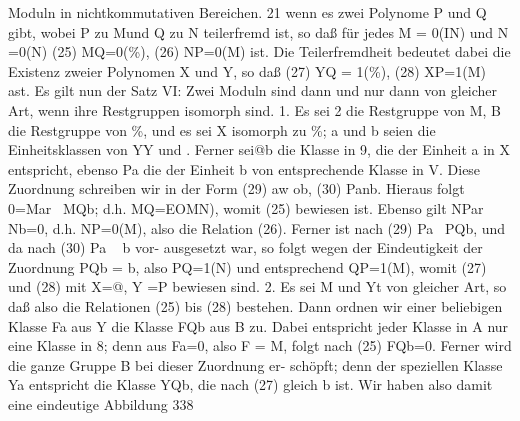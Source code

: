 \documentclass[11pt,a4paper]{article}
\theoremstyle{plain}
\theoremstyle{definition}
\begin{document}
Moduln in nichtkommutativen Bereichen. 
21 
wenn 
es zwei Polynome P und Q gibt, wobei P zu Mund Q zu N 
teilerfremd ist, so daß für jedes 
M = 0(IN) und N =0(N) 
(25) 
MQ=0(\%), 
(26) 
NP=0(M) 
ist. 
Die Teilerfremdheit bedeutet dabei die Existenz zweier Polynomen 
X und Y, so daß 
(27) 
YQ = 1(\%), 
(28) 
XP=1(M) 
ast. 
Es gilt nun der 
Satz VI: Zwei Moduln sind dann und nur dann von gleicher Art, 
wenn ihre Restgruppen isomorph sind. 
1. Es sei 2 die Restgruppe von M, B die Restgruppe von \%, und 
es sei X isomorph zu \%; a und b seien die Einheitsklassen von YY und . 
Ferner sei@b die Klasse in 9, die der Einheit a in X entspricht, ebenso 
Pa die der Einheit b von  entsprechende Klasse in V. Diese Zuordnung 
schreiben wir in der Form 
(29) 
aw ob, 
(30) 
Panb. 
Hieraus folgt 
0=Mar~ MQb; d.h. MQ=EOMN), 
womit (25) bewiesen ist. 
Ebenso gilt 
NPar Nb=0, d.h. NP=0(M), 
also die Relation (26). 
Ferner ist nach (29) Pa~ PQb, und da nach (30) Pa ~ b vor- 
ausgesetzt war, so folgt wegen der Eindeutigkeit der Zuordnung 
PQb = b, 
also PQ=1(N) und entsprechend QP=1(M), womit (27) und (28) 
mit 
X=@, Y 
=P bewiesen sind. 
2. Es sei M und Yt von gleicher Art, so daß also die Relationen 
(25) bis (28) bestehen. 
Dann ordnen wir einer beliebigen Klasse Fa 
aus Y die Klasse 
FQb aus B zu. 
Dabei entspricht jeder Klasse in A 
nur eine Klasse in 8; denn aus Fa=0, also 
F = M, folgt nach (25) 
FQb=0. 
Ferner wird die ganze Gruppe B bei dieser Zuordnung er- 
schöpft; denn der speziellen Klasse Ya entspricht die Klasse YQb, die 
nach (27) gleich b ist. Wir haben also damit eine eindeutige Abbildung  
338
\end{document}
